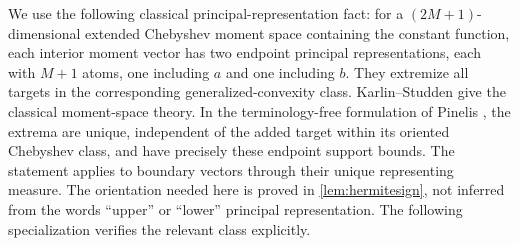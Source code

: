 \documentclass[11pt]{article}
\numberwithin{equation}{section}
\theoremstyle{definition}
\theoremstyle{remark}
\begin{document}
We use the following classical principal-representation fact: for a $(2M+1)$-dimensional extended Chebyshev moment space containing the constant function, each interior moment vector has two endpoint principal representations, each with $M+1$ atoms, one including $a$ and one including $b$. They extremize all targets in the corresponding generalized-convexity class. Karlin--Studden \cite{KarlinStudden1966} give the classical moment-space theory. In the terminology-free formulation of Pinelis \cite[Proposition 2(I) and (IIa)]{Pinelis2011}, the extrema are unique, independent of the added target within its oriented Chebyshev class, and have precisely these endpoint support bounds. The statement applies to boundary vectors through their unique representing measure. The orientation needed here is proved in \cref{lem:hermitesign}, not inferred from the words ``upper'' or ``lower'' principal representation. The following specialization verifies the relevant class explicitly.
\end{document}
